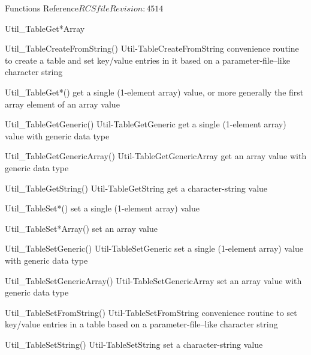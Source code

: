 \begin{cactuspart}{ Functions Reference}{$RCSfile$}{$Revision: 4514 $}
\begin{FunctionDescription}{Util\_TableGet*Array}
\begin{SeeAlsoSection}
\begin{SeeAlso2} {Util\_TableCreateFromString()} {Util-TableCreateFromString}
convenience routine to create a table and set key/value entries
in it based on a parameter-file--like character string
\end{SeeAlso2}
\begin{SeeAlso}{Util\_TableGet*()}
get a single (1-element array) value,
or more generally the first array element of an array value
\end{SeeAlso}
\begin{SeeAlso2} {Util\_TableGetGeneric()} {Util-TableGetGeneric}
get a single (1-element array) value with generic data type
\end{SeeAlso2}
\begin{SeeAlso2} {Util\_TableGetGenericArray()} {Util-TableGetGenericArray}
get an array value with generic data type
\end{SeeAlso2}
\begin{SeeAlso2} {Util\_TableGetString()} {Util-TableGetString}
get a character-string value
\end{SeeAlso2}
\begin{SeeAlso}{Util\_TableSet*()}
set a single (1-element array) value
\end{SeeAlso}
\begin{SeeAlso}{Util\_TableSet*Array()}
set an array value
\end{SeeAlso}
\begin{SeeAlso2} {Util\_TableSetGeneric()} {Util-TableSetGeneric}
set a single (1-element array) value with generic data type
\end{SeeAlso2}
\begin{SeeAlso2} {Util\_TableSetGenericArray()} {Util-TableSetGenericArray}
set an array value with generic data type
\end{SeeAlso2}
\begin{SeeAlso2} {Util\_TableSetFromString()} {Util-TableSetFromString}
convenience routine to set key/value entries in a table based on a
parameter-file--like character string
\end{SeeAlso2}
\begin{SeeAlso2} {Util\_TableSetString()} {Util-TableSetString}
set a character-string value
\end{SeeAlso2}
\end{SeeAlsoSection}


\end{FunctionDescription}
\end{cactuspart}
